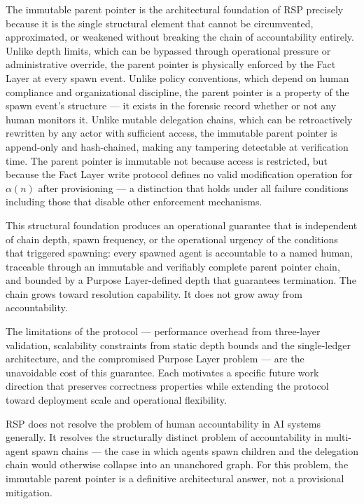 The immutable parent pointer is the architectural foundation of RSP precisely because it is the single structural element that cannot be circumvented, approximated, or weakened without breaking the chain of accountability entirely. Unlike depth limits, which can be bypassed through operational pressure or administrative override, the parent pointer is physically enforced by the Fact Layer at every spawn event. Unlike policy conventions, which depend on human compliance and organizational discipline, the parent pointer is a property of the spawn event's structure — it exists in the forensic record whether or not any human monitors it. Unlike mutable delegation chains, which can be retroactively rewritten by any actor with sufficient access, the immutable parent pointer is append-only and hash-chained, making any tampering detectable at verification time. The parent pointer is immutable not because access is restricted, but because the Fact Layer write protocol defines no valid modification operation for $\alpha(n)$ after provisioning — a distinction that holds under all failure conditions including those that disable other enforcement mechanisms.

This structural foundation produces an operational guarantee that is independent of chain depth, spawn frequency, or the operational urgency of the conditions that triggered spawning: every spawned agent is accountable to a named human, traceable through an immutable and verifiably complete parent pointer chain, and bounded by a Purpose Layer-defined depth that guarantees termination. The chain grows toward resolution capability. It does not grow away from accountability.

The limitations of the protocol — performance overhead from three-layer validation, scalability constraints from static depth bounds and the single-ledger architecture, and the compromised Purpose Layer problem — are the unavoidable cost of this guarantee. Each motivates a specific future work direction that preserves correctness properties while extending the protocol toward deployment scale and operational flexibility.

RSP does not resolve the problem of human accountability in AI systems generally. It resolves the structurally distinct problem of accountability in multi-agent spawn chains — the case in which agents spawn children and the delegation chain would otherwise collapse into an unanchored graph. For this problem, the immutable parent pointer is a definitive architectural answer, not a provisional mitigation.